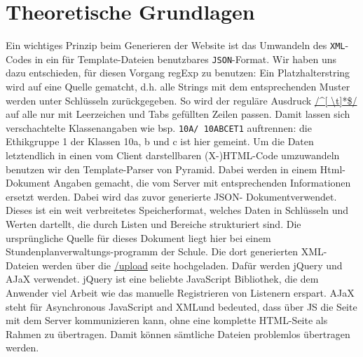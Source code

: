 \chapter{Theoretische Grundlagen}


Ein wichtiges Prinzip beim Generieren der Website ist das Umwandeln des \texttt{XML}-Codes in ein
für Template-Dateien benutzbares \texttt{JSON}-Format. Wir haben uns dazu entschieden, für diesen
Vorgang regExp zu benutzen: Ein Platzhalterstring wird auf eine Quelle gematcht, d.h. alle Strings
mit dem entsprechenden Muster werden unter Schlüsseln zurückgegeben. So wird der reguläre Ausdruck
\url{/^[ \t]*\$/} auf alle nur mit Leerzeichen und Tabs gefüllten Zeilen passen. Damit lassen sich
verschachtelte Klassenangaben wie bsp. \texttt{10A/ 10ABCET1} auftrennen: die Ethikgruppe 1 der
Klassen 10a, b und c ist hier gemeint. Um die Daten letztendlich in einen vom Client darstellbaren
(X-)HTML-Code umzuwandeln benutzen wir den Template-Parser von Pyramid. Dabei werden in einem Html-
Dokument Angaben gemacht, die vom Server mit entsprechenden Informationen ersetzt werden. Dabei wird
das zuvor generierte JSON- Dokumentverwendet. Dieses ist ein weit verbreitetes Speicherformat,
welches Daten in Schlüsseln und Werten dartellt, die durch Listen und Bereiche strukturiert sind.
Die ursprüngliche Quelle für dieses Dokument liegt hier bei einem Stundenplanverwaltungs-programm
der Schule. Die dort generierten XML- Dateien werden über die \url{/upload} seite hochgeladen. Dafür
werden jQuery und AJaX verwendet. jQuery ist eine beliebte JavaScript Bibliothek, die dem Anwender
viel Arbeit wie das manuelle Registrieren von Listenern erspart. AJaX steht für \glqq Asynchronous
JavaScript and XML\grqq und bedeuted, dass über JS die Seite mit dem Server kommunizieren kann, ohne
eine komplette HTML-Seite als Rahmen zu übertragen. Damit können sämtliche Dateien problemlos
übertragen werden.
